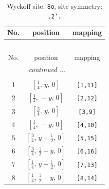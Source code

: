\documentclass[fleqn,8pt]{jsarticle}
\begin{document}
\begin{longtable}{ccc}
\caption{Wyckoff site: {\tt 8o}, site symmetry: {\tt .2'.}}
 \\
 \hline \hline
No. & position & mapping \\ \hline \endfirsthead

\multicolumn{2}{l}{\tablename\ \thetable{}} \\
 \hline \hline
No. & position & mapping \\ \hline \endhead

 \hline \hline
\multicolumn{2}{r}{\footnotesize\it continued ...} \\ \endfoot

 \hline \hline
\multicolumn{2}{r}{} \\ \endlastfoot

1 & $\left[ \frac{1}{4},\, y,\, 0 \right]$ & {\tt [1,11]} \\ \hline
2 & $\left[ \frac{1}{4},\, - y,\, 0 \right]$ & {\tt [2,12]} \\ \hline
3 & $\left[ \frac{3}{4},\, y,\, 0 \right]$ & {\tt [3,9]} \\ \hline
4 & $\left[ \frac{3}{4},\, - y,\, 0 \right]$ & {\tt [4,10]} \\ \hline
5 & $\left[ \frac{3}{4},\, y + \frac{1}{2},\, 0 \right]$ & {\tt [5,15]} \\ \hline
6 & $\left[ \frac{3}{4},\, \frac{1}{2} - y,\, 0 \right]$ & {\tt [6,16]} \\ \hline
7 & $\left[ \frac{1}{4},\, y + \frac{1}{2},\, 0 \right]$ & {\tt [7,13]} \\ \hline
8 & $\left[ \frac{1}{4},\, \frac{1}{2} - y,\, 0 \right]$ & {\tt [8,14]} \\
\end{longtable}
\renewcommand{\arraystretch}{1.2}
\end{document}
